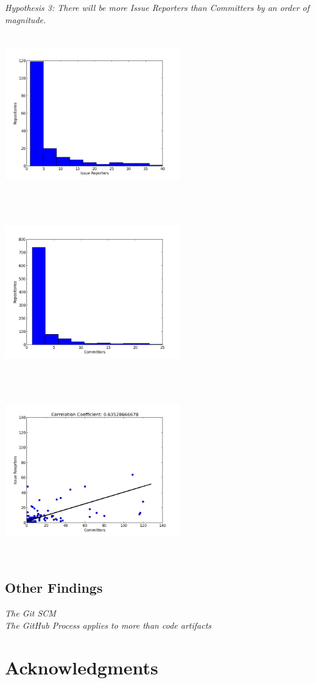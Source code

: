 \documentclass{proc}
\begin{document}
\emph{Hypothesis 3: There will be more Issue Reporters than Committers by an order of magnitude.}\\
\includegraphics[height=3in,width=3in]{images/issue_reporters_histogram.png}
\includegraphics[height=3in,width=3in]{images/committers_histogram.png}
\includegraphics[height=3in,width=3in]{images/issue_reporters_committers_scatterplot.png}

\subsection{Other Findings}
\emph{The Git SCM }\\

\emph{The GitHub Process applies to more than code artifacts}\\

\section{Acknowledgments}


  


\end{document}
